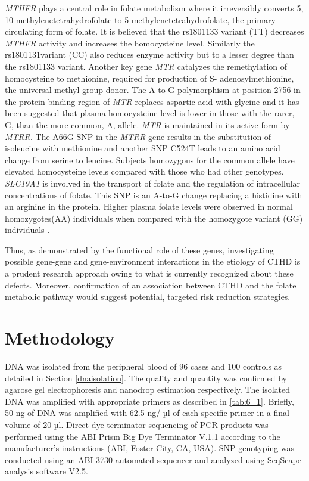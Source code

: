 \begin{refsection}
\begin{sloppypar}\textit{MTHFR} plays a central role in folate metabolism where it irreversibly converts 5, 10-methylenetetrahydrofolate to 5-methylenetetrahydrofolate, the primary circulating form of folate. It is believed that the rs1801133 variant (TT) decreases \textit{MTHFR} activity and increases the homocysteine level. Similarly the rs1801131variant (CC) also reduces enzyme activity but to a lesser degree than the rs1801133 variant. Another key gene \textit{MTR} catalyzes the remethylation of homocysteine to methionine, required for production of S- adenosylmethionine, the universal methyl group donor. The A to G polymorphism at position 2756 in the protein binding region of \textit{MTR} replaces aspartic acid with glycine and it has been suggested that plasma homocysteine level is lower in those with the rarer, G, than the more common, A, allele. \textit{MTR} is maintained in its active form by \textit{MTRR}. The A66G SNP in the \textit{MTRR} gene results in the substitution of isoleucine with methionine and another SNP C524T leads to an amino acid change from serine to leucine. Subjects homozygous for the common allele have elevated homocysteine levels compared with those who had other genotypes. \textit{SLC19A1} is involved in the transport of folate and the regulation of intracellular concentrations of folate. This SNP is an A-to-G change replacing a histidine with an arginine in the protein. Higher plasma folate levels were observed in normal homozygotes(AA) individuals when compared with  the homozygote variant (GG) individuals \cite{bailey2009folate}.\end{sloppypar}

Thus, as demonstrated by the functional role of these genes, investigating possible gene-gene and gene-environment interactions in the etiology of CTHD is a prudent research approach owing to what is currently recognized about these defects. Moreover, confirmation of an association between CTHD and the folate metabolic pathway would suggest potential, targeted risk reduction strategies. 

\section{Methodology}

DNA was isolated from the peripheral blood of 96 cases and 100 controls as detailed in Section \ref{dnaisolation}. The quality and quantity was confirmed by agarose gel electrophoresis and nanodrop estimation respectively. The isolated DNA was amplified with appropriate primers as described in \cref{tab:6_1}. Briefly, 50 ng of DNA was amplified with 62.5 ng/ µl of each specific primer in a final volume of 20 µl. Direct dye terminator sequencing of PCR products was performed using the ABI Prism Big Dye Terminator V.1.1 according to the manufacturer’s instructions (ABI, Foster City, CA, USA). SNP genotyping was conducted using an ABI 3730 automated sequencer and analyzed using SeqScape analysis software V2.5.


\end{refsection}
